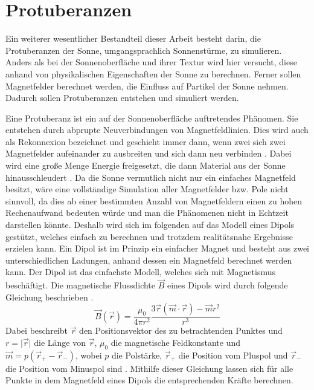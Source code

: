 \section{Protuberanzen}\label{sec:prominences}
Ein weiterer wesentlicher Bestandteil dieser Arbeit besteht darin, die
Protuberanzen der Sonne, umgangsprachlich Sonnenstürme, zu simulieren. Anders
als bei der Sonnenoberfläche und ihrer Textur wird hier versucht, diese
anhand von physikalischen Eigenschaften der Sonne zu berechnen. Ferner sollen
Magnetfelder berechnet werden, die Einfluss auf Partikel der Sonne nehmen.
Dadurch sollen Protuberanzen entstehen und simuliert werden.

Eine Protuberanz ist ein auf der Sonnenoberfläche auftretendes Phänomen. Sie
entstehen durch abprupte Neuverbindungen von Magnetfeldlinien. Dies wird auch
als Rekonnexion bezeichnet und geschieht immer dann, wenn zwei sich zwei
Magnetfelder aufeinander zu ausbreiten und sich dann neu verbinden
\cite{SpanierReconnexion}. Dabei wird eine große Menge Energie freigesetzt,
die dann Material aus der Sonne hinausschleudert \cite{ZirinProminences}. Da
die Sonne vermutlich nicht nur ein einfaches Magnetfeld besitzt, wäre eine
vollständige Simulation aller Magnetfelder bzw. Pole nicht sinnvoll, da dies
ab einer bestimmten Anzahl von Magnetfeldern einen zu hohen Rechenaufwand
bedeuten würde und man die Phänomenen nicht in Echtzeit darstellen könnte.
Deshalb wird sich im folgenden auf das Modell eines Dipols gestützt, welches
einfach zu berechnen und trotzdem realitätsnahe Ergebnisse erzielen kann. Ein
Dipol ist im Prinzip ein einfacher Magnet und besteht aus zwei
unterschiedlichen Ladungen, anhand dessen ein Magnetfeld berechnet werden
kann. Der Dipol ist das einfachste Modell, welches sich mit Magnetismus
beschäftigt. Die magnetische Flussdichte $\vec{B}$ eines Dipols wird durch
folgende Gleichung beschrieben \cite{Stoecker2013}.
\[
  \vec{B}(\vec{r}) = \frac{\mu_0}{4\pi r^2} \frac{3\vec{r}(\vec{m} \cdot
  \vec{r}) - \vec{m}r^2}{r^3}
\]
Dabei beschreibt $\vec{r}$ den Positionsvektor des zu betrachtenden Punktes
und $r = \vert\vec{r}\vert$ die Länge von $\vec{r}$, $\mu_0$ die magnetische
Feldkonstante und $\vec{m} = p(\vec{r}_+ - \vec{r}_-)$, wobei $p$ die
Polstärke, $\vec{r}_+$ die Position vom Pluspol und $\vec{r}_-$ die Position
vom Minuspol sind \cite{brown1962magnetostatic}. Mithilfe dieser Gleichung
lassen sich für alle Punkte in dem Magnetfeld eines Dipols die entsprechenden
Kräfte berechnen.

